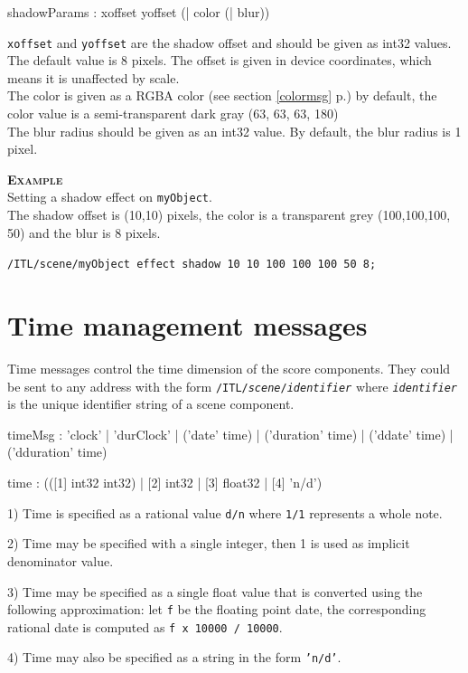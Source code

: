 \documentclass[a4paper,twoside]{report}
\newcommand{\toplevel}[1]	{\chapter{#1}}
\newcommand{\fullref}[1]	{\ref{#1} p.\pageref{#1}}
\newcommand{\OSC}[1]		{\texttt{#1}}
\newcommand{\values}[1]		{\texttt{#1}}
\newcommand{\example}		{\textbf{\hspace{-1.5cm}\textbf{\textsc{Example }}}}
\let\olditemize\itemize
\let\oldenditemize\enditemize
\renewenvironment{itemize} 	{\olditemize \setlength{\itemsep}{1mm}}{\oldenditemize}
\newcommand{\sample}	[1]			{\vspace{-2mm}\begin{center}\colorbox{mygrey}{
								\begin{minipage}[t]{0.9\columnwidth} 
								{\small \texttt{#1}}
								\end{minipage}}\end{center}}
\begin{document}
\begin{rail}
shadowParams : xoffset yoffset (| color (| blur))
\end{rail}

\OSC{xoffset} and \OSC{yoffset} are the shadow offset and should be given as int32 values. The default value is 8 pixels. The offset is given in device coordinates, which means it is unaffected by scale. \\
The color is given as a RGBA color (see section \fullref{colormsg}) by default, the color value is a semi-transparent dark gray (63, 63, 63, 180) \\
The blur radius should be given as an int32 value. By default, the blur radius is 1 pixel.

\example \\
Setting a shadow effect on \OSC{myObject}. \\
The shadow offset is (10,10) pixels, the color is a transparent grey (100,100,100, 50) and the blur is 8 pixels.
\sample{/ITL/scene/myObject effect shadow 10 10 100 100 100 50 8;}


\toplevel{Time management messages}
\label{time}
Time messages control the time dimension of the score components. They could be sent to any address with the form \OSC{/ITL/\textit{scene}/\textit{identifier}} where \OSC{\textit{identifier}} is the unique identifier string of a scene component.
\begin{rail}
timeMsg : 'clock'
		| 'durClock' 
		| ('date' time)
		| ('duration' time) 
		| ('ddate' time) 
		| ('dduration' time) 
\end{rail}

\begin{rail}
time : (([1] int32 int32) | [2] int32 | [3] float32 | [4] 'n/d')
\end{rail}

\begin{itemize}
\item 1) Time is specified as a rational value \values{d/n} where \values{1/1} represents a whole note. 
\item 2) Time may be specified with a single integer, then 1 is used as implicit denominator value.
\item 3) Time may be specified as a single float value that is converted using the following approximation: let \values{f} be the floating point date, the corresponding rational date is computed as \values{f x 10000 / 10000}.
\item 4) Time may also be specified as a string in the form \OSC{'n/d'}.
\end{itemize}
\end{document}
